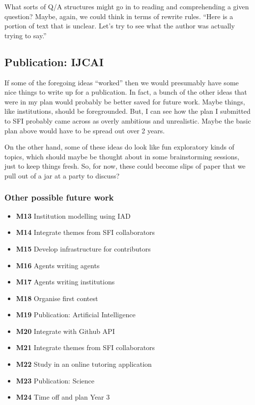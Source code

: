 \documentclass[11pt]{article}
\begin{document}
What sorts of Q/A structures might go in to reading and comprehending
a given question?  Maybe, again, we could think in terms of rewrite
rules.  “Here is a portion of text that is unclear.  Let’s try to see
what the author was actually trying to say.”
\subsection{Publication: IJCAI}
\label{sec:orge9f6a54}

If some of the foregoing ideas “worked” then we would presumably have
some nice things to write up for a publication.  In fact, a bunch of
the other ideas that were in my plan would probably be better saved
for future work.  Maybe things, like institutions, should be
foregrounded.  But, I can see how the plan I submitted to SFI probably
came across as overly ambitious and unrealistic.  Maybe the basic plan
above would have to be spread out over 2 years.

On the other hand, some of these ideas do look like fun exploratory
kinds of topics, which should maybe be thought about in some
brainstorming sessions, just to keep things fresh.  So, for now, these
could become slips of paper that we pull out of a jar at a party to
discuss?

\subsubsection{Other possible future work}
\label{sec:orgeafae6b}

\begin{itemize}
\item \textbf{M13}  Institution modelling using IAD
\item \textbf{M14}  Integrate themes from SFI collaborators
\item \textbf{M15}  Develop infrastructure for contributors
\item \textbf{M16}  Agents writing agents
\item \textbf{M17}  Agents writing institutions
\item \textbf{M18}  Organise first contest
\item \textbf{M19}  Publication: Artificial Intelligence
\item \textbf{M20}  Integrate with Github API
\item \textbf{M21}  Integrate themes from SFI collaborators
\item \textbf{M22}  Study in an online tutoring application
\item \textbf{M23}  Publication: Science
\item \textbf{M24}  Time off and plan Year 3
\end{itemize}
\end{document}
